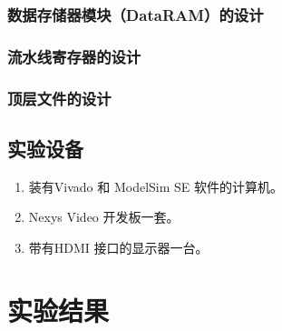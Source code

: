 \documentclass{../source/Experiment}
\begin{document}
        \subsubsection{数据存储器模块（DataRAM）的设计}

        \subsubsection{流水线寄存器的设计}

        \subsubsection{顶层文件的设计}

    \subsection{实验设备}
        \begin{enumerate}
            \item  装有Vivado 和 ModelSim SE 软件的计算机。
            \item  Nexys Video 开发板一套。
            \item  带有HDMI 接口的显示器一台。
        \end{enumerate}

    \section{实验结果}
        
\end{document}
